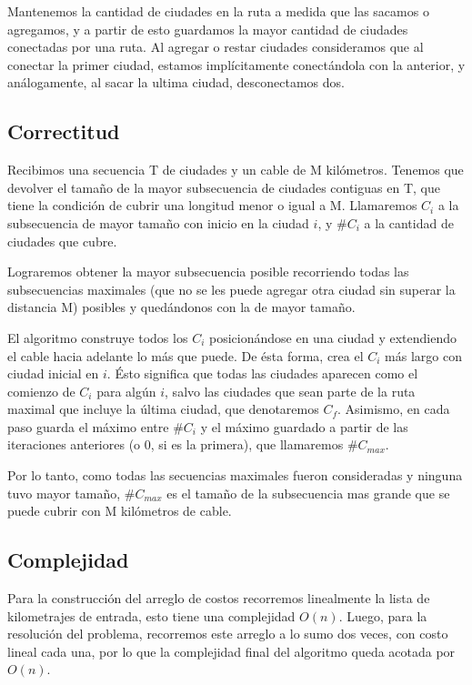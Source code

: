 Mantenemos la cantidad de ciudades en la ruta a medida que las sacamos o agregamos, y a partir de esto guardamos la mayor cantidad de ciudades conectadas por una ruta. 
Al agregar o restar ciudades consideramos que al conectar la primer ciudad, estamos implícitamente conectándola con la anterior, y análogamente, al sacar la ultima ciudad, desconectamos dos.

\subsection{Correctitud}
Recibimos una secuencia T de ciudades y un cable de M kilómetros. Tenemos que devolver el tamaño de la mayor subsecuencia de ciudades contiguas en T, que tiene la condición de cubrir una longitud menor o igual a M. Llamaremos $C_i$ a la subsecuencia de mayor tamaño con inicio en la ciudad $i$, y \#$C_i$ a la cantidad de ciudades que cubre.

Lograremos obtener la mayor subsecuencia posible recorriendo todas las subsecuencias maximales (que no se les puede agregar otra ciudad sin superar la distancia M) posibles y quedándonos con la de mayor tamaño.

\newpage

El algoritmo construye todos los $C_{i}$ posicionándose en una ciudad y extendiendo el cable hacia adelante lo más que puede. De ésta forma, crea el $C_{i}$ más largo con ciudad inicial en $i$. Ésto significa que todas las ciudades aparecen como el comienzo de $C_{i}$ para algún $i$, salvo las ciudades que sean parte de la ruta maximal que incluye la última ciudad, que denotaremos $C_f$.
Asimismo, en cada paso guarda el máximo entre \#$C_{i}$ y el máximo guardado a partir de las iteraciones anteriores (o 0, si es la primera), que llamaremos \#$C_{max}$.

Por lo tanto, como todas las secuencias maximales fueron consideradas y ninguna tuvo mayor tamaño, \#$C_{max}$ es el tamaño de la subsecuencia mas grande que se puede cubrir con M kilómetros de cable.


\subsection{Complejidad}

Para la construcción del arreglo de costos recorremos linealmente la lista de kilometrajes de entrada, esto tiene una complejidad $O(n)$.
Luego, para la resolución del problema, recorremos este arreglo a lo sumo dos veces, con costo lineal cada una, por lo que la complejidad final del algoritmo queda acotada por $O(n)$.


